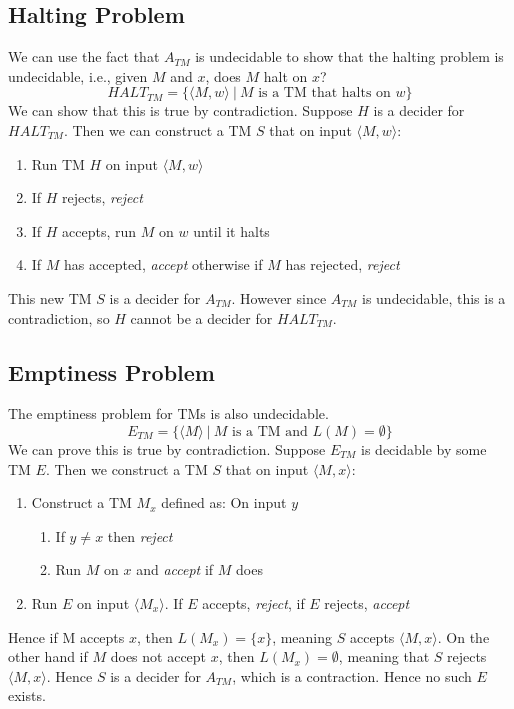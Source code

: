 \documentclass{article}
\newcommand{\encode}[1]{\langle #1 \rangle}
\begin{document}
    \subsection{Halting Problem}
        We can use the fact that $A_{TM}$ is undecidable to show that the halting problem is undecidable, i.e., given $M$ and $x$, does $M$ halt on $x$?
        \[ HALT_{TM} = \{ \encode{M,w} \ | \ \text{$M$ is a TM that halts on $w$} \} \]
        We can show that this is true by contradiction. Suppose $H$ is a decider for $HALT_{TM}$. Then we can construct a TM $S$ that on input $\encode{M, w}$:
        \begin{enumerate}
            \item Run TM $H$ on input $\encode{M, w}$
            \item If $H$ rejects, \textit{reject}
            \item If $H$ accepts, run $M$ on $w$ until it halts
            \item If $M$ has accepted, \textit{accept} otherwise if $M$ has rejected, \textit{reject}
        \end{enumerate}
        This new TM $S$ is a decider for $A_{TM}$. However since $A_{TM}$ is undecidable, this is a contradiction, so $H$ cannot be a decider for $HALT_{TM}$. 
    \subsection{Emptiness Problem}
        The emptiness problem for TMs is also undecidable.
        \[ E_{TM} = \{ \encode{M} \ | \ \text{$M$ is a TM and $L(M) = \emptyset$} \} \]
        We can prove this is true by contradiction. Suppose $E_{TM}$ is decidable by some TM $E$. Then we construct a TM $S$ that on input $\encode{M, x}$:
        \begin{enumerate}
            \item Construct a TM $M_x$ defined as: On input $y$
            \begin{enumerate}
                \item If $y \neq x$ then \textit{reject}
                \item Run $M$ on $x$ and \textit{accept} if $M$ does
            \end{enumerate}
            \item Run $E$ on input $\encode{M_x}$. If $E$ accepts, \textit{reject}, if $E$ rejects, \textit{accept} 
        \end{enumerate}
        Hence if M accepts $x$, then $L(M_x) = \{ x \}$, meaning $S$ accepts $\encode{M, x}$. On the other hand if $M$ does not accept $x$, then $L(M_x) = \emptyset$, meaning that $S$ rejects $\encode{M, x}$. Hence $S$ is a decider for $A_{TM}$, which is a contraction. Hence no such $E$ exists. \\ \\
\end{document}
